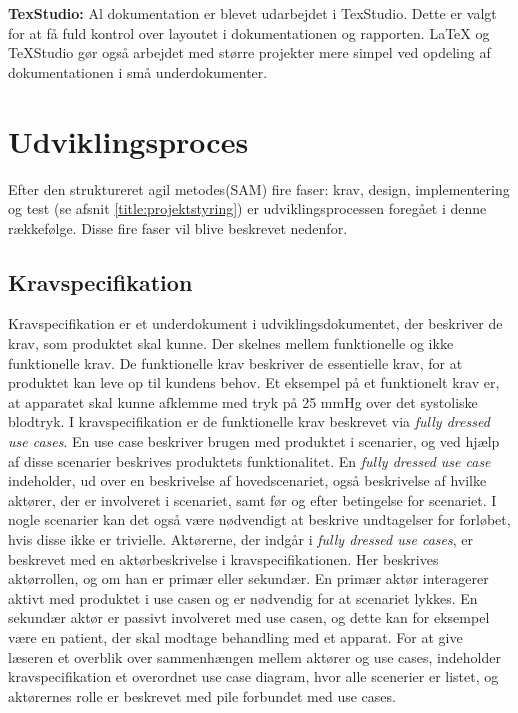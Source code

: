 \textbf{TexStudio:} Al dokumentation er blevet udarbejdet i TexStudio. Dette er valgt for at få fuld kontrol over layoutet i dokumentationen og rapporten. LaTeX og TeXStudio gør også arbejdet med større projekter mere simpel ved opdeling af dokumentationen i små underdokumenter.


\section{Udviklingsproces} \label{title:udviklingMetode}
Efter den struktureret agil metodes(SAM) fire faser: krav, design, implementering og test (se afsnit \ref{title:projektstyring}) er udviklingsprocessen foregået i denne rækkefølge. Disse fire faser vil blive beskrevet nedenfor.

	\subsection{Kravspecifikation} \label{title:kravspecifikation}
	Kravspecifikation er et underdokument i udviklingsdokumentet, der beskriver de krav, som produktet skal kunne. Der skelnes mellem funktionelle og ikke funktionelle krav. De funktionelle krav beskriver de essentielle krav, for at produktet kan leve op til kundens behov. Et eksempel på et funktionelt krav er, at apparatet skal kunne afklemme med tryk på 25 mmHg over det systoliske blodtryk. I kravspecifikation er de funktionelle krav beskrevet via \textit{fully dressed use cases}. En use case beskriver brugen med produktet i scenarier, og ved hjælp af disse scenarier beskrives produktets funktionalitet. En \textit{fully dressed use case} indeholder, ud over en beskrivelse af hovedscenariet, også beskrivelse af hvilke aktører, der er involveret i scenariet, samt før og efter betingelse for scenariet. I nogle scenarier kan det også være nødvendigt at beskrive undtagelser for forløbet, hvis disse ikke er trivielle. Aktørerne, der indgår i \textit{fully dressed use cases}, er beskrevet med en aktørbeskrivelse i kravspecifikationen. Her beskrives aktørrollen, og om han er primær eller sekundær. En primær aktør interagerer aktivt med produktet i use casen og er nødvendig for at scenariet lykkes. En sekundær aktør er passivt involveret med use casen, og dette kan for eksempel være en patient, der skal modtage behandling med et apparat. For at give læseren et overblik over sammenhængen mellem aktører og use cases, indeholder kravspecifikation et overordnet use case diagram, hvor alle scenerier er listet, og aktørernes rolle er beskrevet med pile forbundet med use cases. 
	
